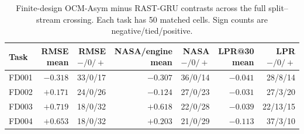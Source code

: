 \begin{table}[H]
\centering
\scriptsize
\setlength{\tabcolsep}{3.5pt}
\caption{Finite-design OCM-Asym minus RAST-GRU contrasts across the full split--stream crossing. Each task has 50 matched cells. Sign counts are negative/tied/positive.}
\label{tab:supp-full-crossing}
\begin{tabular}{@{}lrrrrrr@{}}
\toprule
Task & RMSE mean & RMSE $-/0/+$ & NASA/engine mean & NASA $-/0/+$ & LPR@30 mean & LPR $-/0/+$ \\
\midrule
FD001 & $-0.318$ & 33/0/17 & $-0.307$ & 36/0/14 & $-0.041$ & 28/8/14 \\
FD002 & $+0.171$ & 24/0/26 & $-0.124$ & 27/0/23 & $-0.031$ & 27/3/20 \\
FD003 & $+0.719$ & 18/0/32 & $+0.618$ & 22/0/28 & $-0.039$ & 22/13/15 \\
FD004 & $+0.653$ & 18/0/32 & $+0.203$ & 21/0/29 & $-0.113$ & 37/3/10 \\
\bottomrule
\end{tabular}
\end{table}
